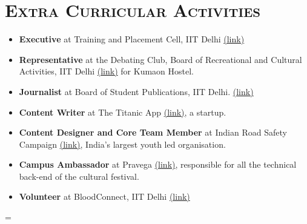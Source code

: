 \documentclass{article}
\newenvironment{longversion}{}{} %
\newenvironment{absolutelynopagebreak}
  {\par\nobreak\vfil\penalty0\vfilneg
   \vtop\bgroup}
  {\par\xdef\tpd{\the\prevdepth}\egroup
   \prevdepth=\tpd}
\newcommand{\tmpsection}[1]{}
\let\tmpsection=\section
\renewcommand{\section}[1]{\tmpsection*{\textsc{#1}}}
\begin{document}
\begin{absolutelynopagebreak}




\section{Extra Curricular Activities}


\begin{itemize}
    \setlength\itemsep{0em}
    \item \textbf{Executive} at Training and Placement Cell, IIT Delhi \href{https://tnp.iitd.ac.in/newtnp/}{(link)}
    \item \textbf{Representative} at the Debating Club, Board of Recreational and Cultural Activities, IIT Delhi \href{http://brca.iitd.ac.in/}{(link)} for Kumaon Hostel.
    \item \textbf{Journalist} at Board of Student Publications, IIT Delhi. \href{http://bsp.iitd.ac.in/}{(link)}
    \item \textbf{Content Writer} at The Titanic App \href{http://titanicapp.co/}{(link)}, a startup.
    \item \textbf{Content Designer and Core Team Member} at Indian Road Safety Campaign \href{https://www.road-safety.co.in/}{(link)}, India's largest youth led organisation.
    \item \textbf{Campus Ambassador} at Pravega \href{http://pravega.org/}{(link)}, responsible for all the technical back-end of the cultural festival.
    \item \textbf{Volunteer} at BloodConnect, IIT Delhi \href{http://www.bloodconnect.org/}{(link)}
    

\end{itemize}
\end{absolutelynopagebreak}
\end{document}
